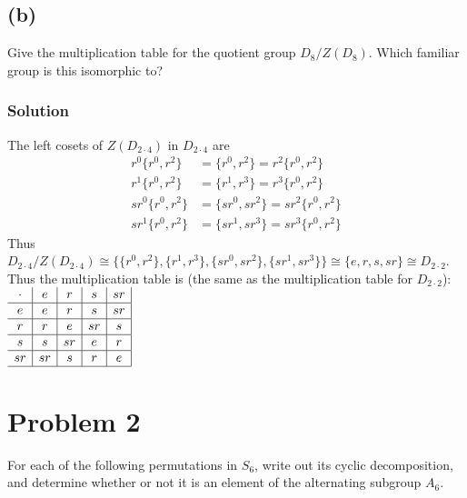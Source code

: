 \documentclass[fleqn]{article}
\begin{document}
        \pagebreak
        
        \subsection{(b)}
        Give the multiplication table for the quotient group $D_8/Z(D_8)$.  Which familiar group is this isomorphic to?
        
            \subsubsection{Solution}
            The left cosets of $Z(D_{2 \cdot 4})$ in $D_{2 \cdot 4}$ are
            \begin{align}
                r^0 \{r^0, r^2\} &= \{r^0, r^2\} = r^2 \{r^0, r^2\} \\
                r^1 \{r^0, r^2\} &= \{r^1, r^3\} = r^3 \{r^0, r^2\} \\
                sr^0 \{r^0, r^2\} &= \{sr^0, sr^2\} = sr^2 \{r^0, r^2\} \\
                sr^1 \{r^0, r^2\} &= \{sr^1, sr^3\} = sr^3 \{r^0, r^2\}
            \end{align}
            Thus $D_{2 \cdot 4}/Z(D_{2 \cdot 4}) \cong \{\{r^0, r^2\}, \{r^1, r^3\}, \{sr^0, sr^2\}, \{sr^1, sr^3\}\} \cong \{e, r, s, sr\} \cong D_{2 \cdot 2}$.  Thus the multiplication table is (the same as the multiplication table for $D_{2 \cdot 2}$): \\
            
            $\begin{array}{ c|c|c|c|c| } 
                \cdot & e  & r  & s  & sr \\ \hline
                e     & e  & r  & s  & sr \\ \hline
                r     & r  & e  & sr & s  \\ \hline
                s     & s  & sr & e  & r  \\ \hline
                sr    & sr & s  & r  & e  \\ \hline
            \end{array}$
    
    \section{Problem 2}
    For each of the following permutations in $S_6$, write out its cyclic decomposition, and determine whether or not it is an element of the alternating subgroup $A_6$.
        
\end{document}
